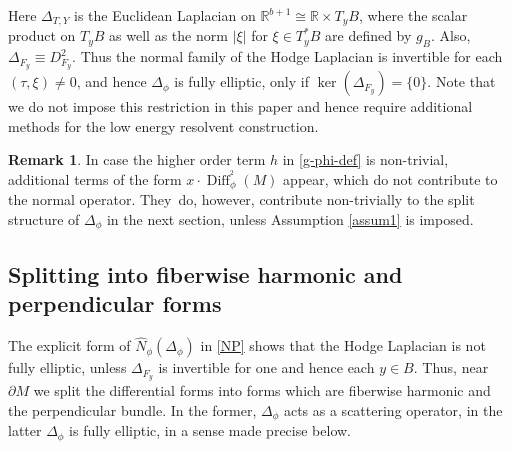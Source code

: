 \documentclass[JEP,XML,SOM,Unicode,NoFloatCountersInSection,published]{cedram}
\theoremstyle{plain}
\theoremstyle{definition}
\newtheorem{Rem}[Th]{Remark}
\newcommand{\R}{{\mathbb{R}}}
\DeclareMathOperator{\Diff}{Diff}
\begin{document}
Here $\Delta_{T,Y}$ is the Euclidean Laplacian on $\R^{b+1}\cong\R\times T_yB$, where the scalar product on $T_yB$ as well as the norm $ \vert \xi\vert$ for $\xi\in T^*_{y}B$ are defined by $g_B$. Also, $\Delta_{F_y} \equiv D^2_{F_y}$.
Thus the normal family of the Hodge Laplacian is invertible for each $(\tau,\xi) \neq 0$,
and hence $\Delta_{\phi}$ is fully elliptic, only if $\ker(\Delta_{F_y}) = \{0\}$. Note that we do not
impose this restriction in this paper and hence require additional methods for the low energy resolvent construction.

\begin{Rem}
In case the higher order term $h$ in \eqref{g-phi-def}
is non-trivial, additional terms of the form $x\cdot \Diff^{^2}_{\phi}(M)$
appear, which do not contribute to the normal operator. They~do, however,
contribute non-trivially to the split structure of $\Delta_{\phi}$ in the next section,
unless Assumption \ref{assum1} is imposed.
\end{Rem}

\subsection{Splitting into fiberwise harmonic and perpendicular forms}

The explicit form of $\widehat{N}_\phi(\Delta_{\phi})$ in \eqref{NP} shows that the
Hodge Laplacian is not fully elliptic, unless $\Delta_{F_y}$ is invertible for one and hence each $y\in B$. Thus,
near $\partial M$ we split the differential forms into forms which are fiberwise harmonic and
the perpendicular bundle. In the former, $\Delta_{\phi}$
acts as a scattering operator, in the latter $\Delta_{\phi}$ is fully elliptic, in a sense made precise below.
\end{document}
